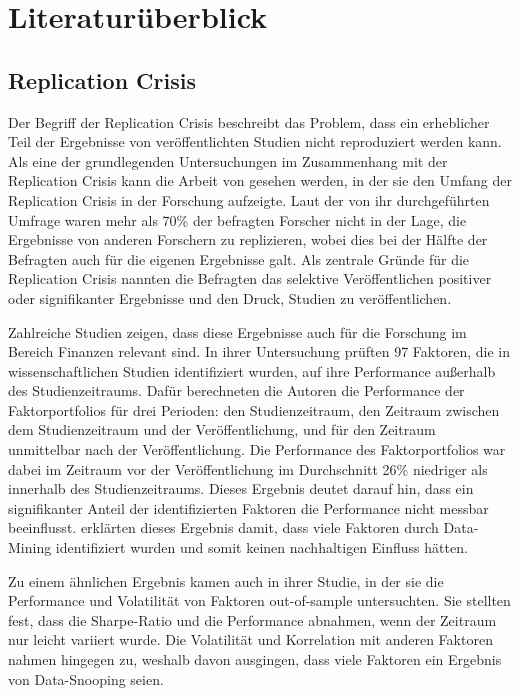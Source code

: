 \documentclass[a4paper, 12pt]{article}
\begin{document}
\section{Literaturüberblick}

\subsection{Replication Crisis}\label{sec:Literatur}
Der Begriff der Replication Crisis beschreibt das Problem, dass ein erheblicher Teil der Ergebnisse von veröffentlichten Studien nicht reproduziert werden kann.
Als eine der grundlegenden Untersuchungen im Zusammenhang mit der Replication Crisis kann die Arbeit von \textcite{Baker2016} gesehen werden, in der sie den Umfang der Replication Crisis in der Forschung aufzeigte.
Laut der von ihr durchgeführten Umfrage waren mehr als 70\% der befragten Forscher nicht in der Lage, die Ergebnisse von anderen Forschern zu replizieren, wobei dies bei der Hälfte der Befragten auch für die eigenen Ergebnisse galt.
Als zentrale Gründe für die Replication Crisis nannten die Befragten das selektive Veröffentlichen positiver oder signifikanter Ergebnisse und den Druck, Studien zu veröffentlichen.
\vspace{\baselineskip}

Zahlreiche Studien zeigen, dass diese Ergebnisse auch für die Forschung im Bereich Finanzen relevant sind.
In ihrer Untersuchung prüften \textcite{Mclean2016} 97 Faktoren, die in wissenschaftlichen Studien identifiziert wurden, auf ihre Performance außerhalb des Studienzeitraums.
Dafür berechneten die Autoren die Performance der Faktorportfolios für drei Perioden: den Studienzeitraum, den Zeitraum zwischen dem Studienzeitraum und der Veröffentlichung, und für den Zeitraum unmittelbar nach der Veröffentlichung.
Die Performance des Faktorportfolios war dabei im Zeitraum vor der Veröffentlichung im Durchschnitt 26\% niedriger als innerhalb des Studienzeitraums.
Dieses Ergebnis deutet darauf hin, dass ein signifikanter Anteil der identifizierten Faktoren die Performance nicht messbar beeinflusst.
\citeauthor{Mclean2016} erklärten dieses Ergebnis damit, dass viele Faktoren durch Data-Mining identifiziert wurden und somit keinen nachhaltigen Einfluss hätten.

Zu einem ähnlichen Ergebnis kamen auch \textcite{Linnainmaa2018} in ihrer Studie, in der sie die Performance und Volatilität von Faktoren out-of-sample untersuchten.
Sie stellten fest, dass die Sharpe-Ratio und die Performance abnahmen, wenn der Zeitraum nur leicht variiert wurde.
Die Volatilität und Korrelation mit anderen Faktoren nahmen hingegen zu, weshalb \citeauthor{Linnainmaa2018} davon ausgingen, dass viele Faktoren ein Ergebnis von Data-Snooping seien.
\end{document}
